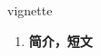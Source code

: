 
\begin{frame}
{\huge vignette}
\begin{center}
\begin{enumerate}\Large
  \item \textbf{简介，短文}
\end{enumerate}
\end{center}
\end{frame}
